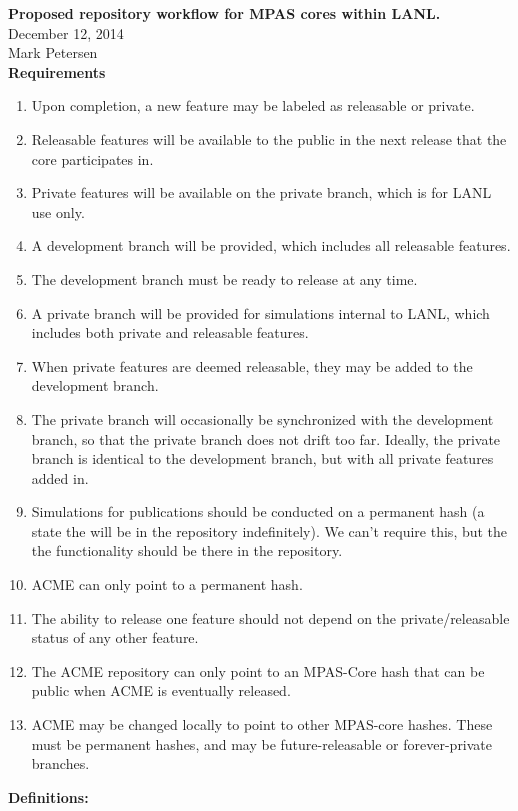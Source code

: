 \documentclass[11pt]{article}
\begin{document}
{\bf Proposed repository workflow for MPAS cores within LANL.}\\
December 12, 2014\\
Mark Petersen\\

{\bf Requirements}
\begin{enumerate}
\item Upon completion, a new feature may be labeled as releasable or private.
\item Releasable features will be available to the public in the next release that the core participates in.
\item Private features will be available on the private branch, which is for LANL use only.
\item A development branch will be provided, which includes all releasable features.  
\item The development branch must be ready to release at any time.
\item A private branch will be provided for simulations internal to LANL, which includes both private and releasable features.
\item When private features are deemed releasable, they may be added to the development branch.
\item The private branch will occasionally be synchronized with the development branch, so that the private branch does not drift too far.  Ideally, the private branch is identical to the development branch, but with all private features added in.
\item Simulations for publications should be conducted on a permanent hash (a state the will be in the repository indefinitely).  We can't require this, but the the functionality should be there in the repository.
\item ACME can only point to a permanent hash.
\item The ability to release one feature should not depend on the private/releasable status of any other feature.
\item The ACME repository can only point to an MPAS-Core hash that can be public when ACME is eventually released.
\item ACME may be changed locally to point to other MPAS-core hashes.  These must be permanent hashes, and may be future-releasable or forever-private branches.
\end{enumerate}

\clearpage

{\bf Definitions:}\\
\end{document}
